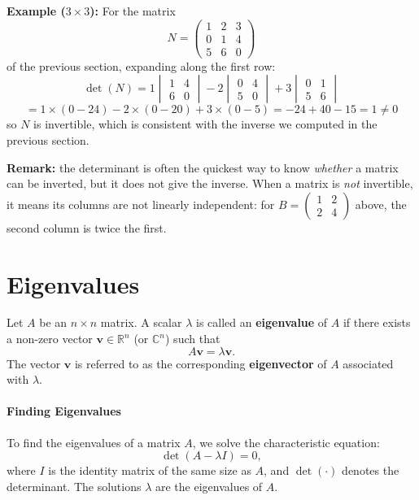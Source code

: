 \documentclass[]{article}
\begin{document}
	\noindent \textbf{Example ($3 \times 3$):} For the matrix
	$$
	N = \begin{pmatrix} 1 & 2 & 3 \\ 0 & 1 & 4 \\ 5 & 6 & 0 \end{pmatrix}
	$$
	of the previous section, expanding along the first row:
	$$
	\det(N) =
	1 \begin{vmatrix} 1 & 4 \\ 6 & 0 \end{vmatrix}
	- 2 \begin{vmatrix} 0 & 4 \\ 5 & 0 \end{vmatrix}
	+ 3 \begin{vmatrix} 0 & 1 \\ 5 & 6 \end{vmatrix}
	$$
	$$
	= 1 \times (0 - 24) - 2 \times (0 - 20) + 3 \times (0 - 5) = -24 + 40 - 15 = 1 \neq 0
	$$
	so $N$ is invertible, which is consistent with the inverse we computed in the previous section.

	\noindent \textbf{Remark:} the determinant is often the quickest way to know \textit{whether} a matrix can be inverted, but it does not give the inverse.
	When a matrix is \textit{not} invertible, it means its columns are not linearly independent: for $B = \begin{pmatrix} 1 & 2 \\ 2 & 4 \end{pmatrix}$ above, the second column is twice the first.
		
	\section{Eigenvalues}
	
	Let $A$ be an $n \times n$ matrix.
	A scalar $\lambda$ is called an \textbf{eigenvalue} of $A$ if there exists a non-zero vector $\mathbf{v} \in \mathbb{R}^n$ (or $\mathbb{C}^n$) such that
	$$
	A \mathbf{v} = \lambda \mathbf{v}.
	$$
	The vector $\mathbf{v}$ is referred to as the corresponding \textbf{eigenvector} of $A$ associated with $\lambda$.
	
	\paragraph{Finding Eigenvalues}
	To find the eigenvalues of a matrix $ A $, we solve the characteristic equation:
	$$
	\det(A - \lambda I) = 0,
	$$
	where $ I $ is the identity matrix of the same size as $ A $, and $ \det(\cdot) $ denotes the determinant. The solutions $ \lambda $ are the eigenvalues of $ A $.
	
\end{document}
